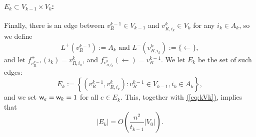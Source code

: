 \documentclass{theoretics}
\newcommand{\eq}[1]{\hyperref[eq:#1]{(\ref*{eq:#1})}}
\renewcommand{\>}{\rangle}
\newcommand{\<}{\langle}
\renewcommand{\(}{\left(}
\renewcommand{\)}{\right)}
\def\w{{\sf w}}
\begin{document}
\paragraph{$E_k\subset V_{k-1}\times V_k$:} Finally, there is an edge between $v^{k-1}_{R}\in V_{k-1}$ and $v^k_{R,i_k}\in V_k$ for any $i_k\in A_k$, so we define 
$$L^+(v_R^{k-1}):= A_k
\mbox{ and }
L^-(v_{R,i_k}^k):=\{\leftarrow\},$$
and let $f^+_{v_R^{k-1}}(i_k)=v_{R,i_k}^k$, and $f^-_{v_{R,i_k}^k}(\leftarrow)=v_{R}^{k-1}$. We let $E_k$ be the set of such edges:
$$E_k:=\left\{(v_{R}^{k-1},v_{R,i_k}^k):v_{R}^{k-1}\in V_{k-1},i_k\in A_k\right\},$$
and we set $\w_e=\w_k=1$ for all $e\in E_k$. This, together with \eq{kVk}, implies that 
\begin{equation}
|E_k|=O\left(\frac{n^2}{t_{k-1}}|V_0|\right).
\label{eq:kEk}
\end{equation}
\end{document}
